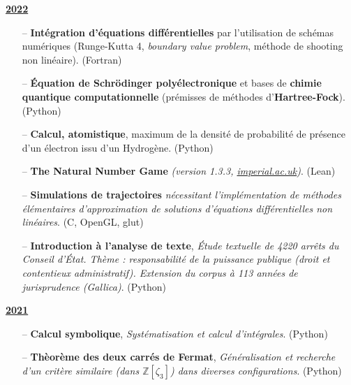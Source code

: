 \documentclass[10pt]{article}
\begin{document}
	\underline{\textbf{\large{2022}}}
	\\[-0.6cm]	
		\begin{itemize}[itemsep = -0.75 mm]
			\item[--] \noindent \textbf{Intégration d'équations différentielles} par l'utilisation de schémas numériques (Runge-Kutta 4, \textit{boundary value problem}, méthode de shooting non linéaire). (Fortran)
			\item[--] \noindent \textbf{Équation de Schrödinger polyélectronique} et bases de \textbf{chimie quantique computationnelle} (prémisses de méthodes d'\textbf{Hartree-Fock}). (Python)
			\item[--] \noindent \textbf{Calcul, atomistique}, maximum de la densité de probabilité de présence d'un électron issu d'un Hydrogène. (Python)
			\item[--] \noindent \textbf{The Natural Number Game} \textit{(version 1.3.3, \href{https://www.ma.imperial.ac.uk/~buzzard/xena/natural_number_game/}{imperial.ac.uk})}. (Lean)
			\item[--] \noindent \textbf{Simulations de trajectoires} \textit{nécessitant l'implémentation de méthodes élémentaires d'approximation de solutions d'équations différentielles non linéaires}. (C, OpenGL, glut)
			\item[--] \noindent \textbf{Introduction à l'analyse de texte}, \textit{Étude textuelle de 4220 arrêts du Conseil d'État. Thème : responsabilité de la puissance publique (droit et contentieux administratif). Extension du corpus à 113 années de jurisprudence (Gallica)}. (Python)
	
		\end{itemize}
	
	
	
	\underline{\textbf{\large{2021}}}
	\\[-0.6cm]	
	
		\begin{itemize}[itemsep = -0.75 mm]
			\item[--] \noindent \textbf{Calcul symbolique}, \textit{Systématisation et calcul d'intégrales}. (Python)
			\item[--] \noindent \textbf{Thèorème des deux carrés de Fermat}, \textit{Généralisation et recherche d'un critère similaire (dans $\mathbb{Z}[\zeta_3]$) dans diverses configurations}. (Python)
		\end{itemize}
	
\end{document}
